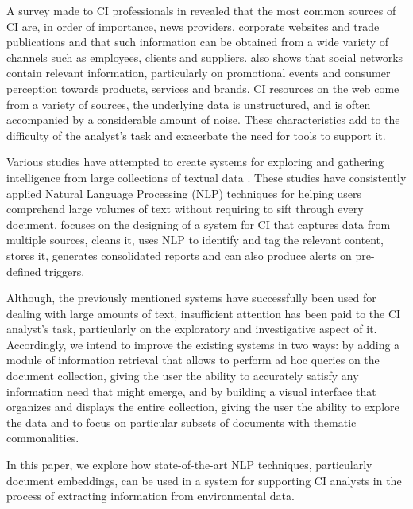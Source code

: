 \documentclass[a4paper]{article}
\begin{document}
A survey made to CI professionals in \citet{marin2004} revealed that the most common sources of CI are, in order of importance, news providers, corporate websites and trade publications and that such information can be obtained from a wide variety of channels such as employees, clients and suppliers. \citet{dey2011} also shows that social networks contain relevant information, particularly on promotional events and consumer perception towards products, services and brands. CI resources on the web come from a variety of sources, the underlying data is unstructured, and is often accompanied by a considerable amount of noise. These characteristics add to the difficulty of the analyst's task and exacerbate the need for tools to support it.

Various studies have attempted to create systems for exploring and gathering intelligence from large collections of textual data \citep{ji2019, lafia2019, lafia2021a, dey2011}. These studies have consistently applied Natural Language Processing (NLP) techniques for helping users comprehend large volumes of text without requiring to sift through every document. \citet{dey2011} focuses on the designing of a system for CI that captures data from multiple sources, cleans it, uses NLP to identify and tag the relevant content, stores it, generates consolidated reports and can also produce alerts on pre-defined triggers. 

Although, the previously mentioned systems have successfully been used for dealing with large amounts of text, insufficient attention has been paid to the CI analyst's task, particularly on the exploratory and investigative aspect of it. Accordingly, we intend to improve the existing systems in two ways: by adding a module of information retrieval that allows to perform ad hoc queries on the document collection, giving the user the ability to accurately satisfy any information need that might emerge, and by building a visual interface that organizes and displays the entire collection, giving the user the ability to explore the data and to focus on particular subsets of documents with thematic commonalities.

In this paper, we explore how state-of-the-art NLP techniques, particularly document embeddings, can be used in a system for supporting CI analysts in the process of extracting information from environmental data.
\end{document}

